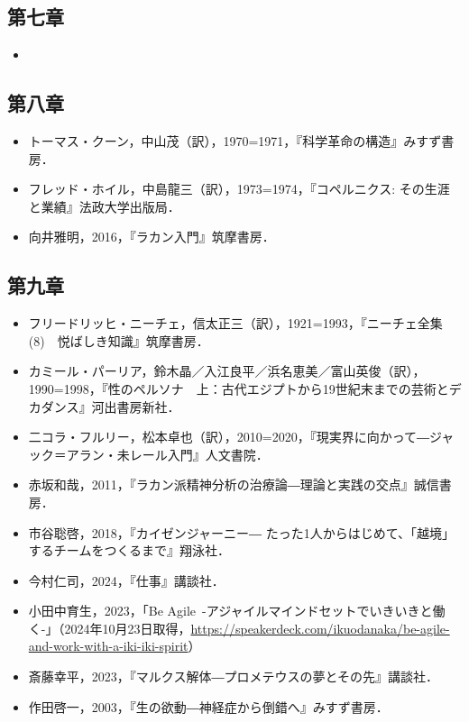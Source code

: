 \subsection{第七章}\label{ux7b2cux4e03ux7ae0}

\begin{itemize}
\tightlist
\item
\end{itemize}

\subsection{第八章}\label{ux7b2cux516bux7ae0}

\begin{itemize}
\tightlist
\item
  トーマス・クーン，中山茂（訳），1970=1971，『科学革命の構造』みすず書房．
\item
  フレッド・ホイル，中島龍三（訳），1973=1974，『コペルニクス:
  その生涯と業績』法政大学出版局．
\item
  向井雅明，2016，『ラカン入門』筑摩書房．
\end{itemize}

\subsection{第九章}\label{ux7b2cux4e5dux7ae0}

\begin{itemize}
\tightlist
\item
  フリードリッヒ・ニーチェ，信太正三（訳），1921=1993，『ニーチェ全集
  (8)　悦ばしき知識』筑摩書房．
\item
  カミール・パーリア，鈴木晶／入江良平／浜名恵美／富山英俊（訳），1990=1998，『性のペルソナ　上：古代エジプトから19世紀末までの芸術とデカダンス』河出書房新社．
\item
  二コラ・フルリー，松本卓也（訳），2010=2020，『現実界に向かって―ジャック＝アラン・未レール入門』人文書院．
\item
  赤坂和哉，2011，『ラカン派精神分析の治療論―理論と実践の交点』誠信書房．
\item
  市谷聡啓，2018，『カイゼンジャーニー―
  たった1人からはじめて、「越境」するチームをつくるまで』翔泳社．
\item
  今村仁司，2024，『仕事』講談社．
\item
  小田中育生，2023，「Be
  Agile~-アジャイルマインドセットでいきいきと働く-」（2024年10月23日取得，\url{https://speakerdeck.com/ikuodanaka/be-agile-and-work-with-a-iki-iki-spirit}）
\item
  斎藤幸平，2023，『マルクス解体―プロメテウスの夢とその先』講談社．
\item
  作田啓一，2003，『生の欲動―神経症から倒錯へ』みすず書房．
\end{itemize}

